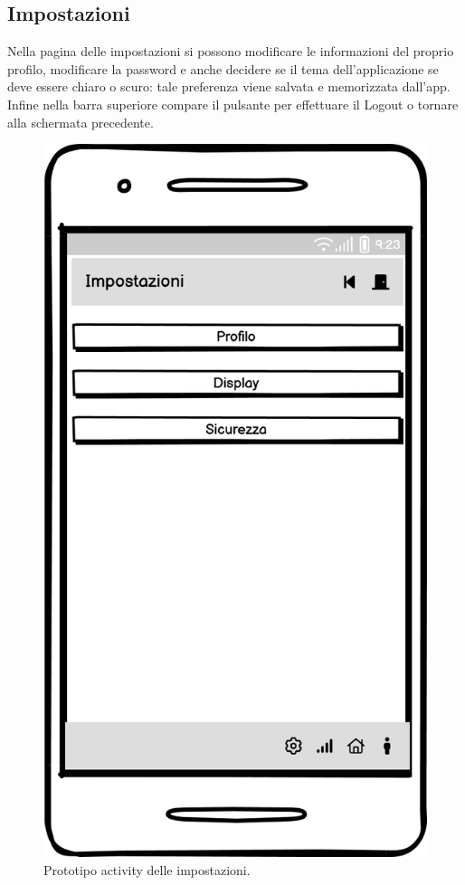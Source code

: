 \documentclass[a4paper,final,12pt]{report}
\begin{document}
\subsection{Impostazioni}
Nella pagina delle impostazioni si possono modificare le informazioni del proprio profilo, modificare la password e anche decidere se il tema dell'applicazione se deve essere chiaro o scuro: tale preferenza viene salvata e memorizzata dall'app. Infine nella barra superiore compare il pulsante per effettuare il Logout o tornare alla schermata precedente.
\begin{figure}[hbtp]
\centering
\includegraphics[scale=0.29]{img_concettuale/Imp_mob.png}
\caption{Prototipo activity delle impostazioni.}
\end{figure}
\end{document}
